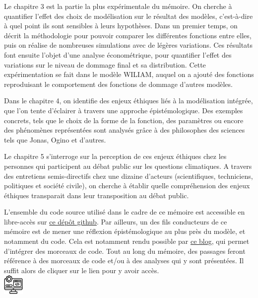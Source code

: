Le chapitre 3 est la partie la plus expérimentale du mémoire. On cherche à quantifier l'effet des choix de modélisation sur le résultat des modèles, c'est-à-dire à quel point ils sont sensibles à leurs hypothèses. Dans un premier temps, on décrit la méthodologie pour pouvoir comparer les différentes fonctions entre elles, puis on réalise de nombreuses simulations avec de légères variations. Ces résultats font ensuite l'objet d'une analyse économétrique, pour quantifier l'effet des variations sur le niveau de dommage final et sa distribution. Cette expérimentation se fait dans le modèle WILIAM, auquel on a ajouté des fonctions reproduisant le comportement des fonctions de dommage d'autres modèles.

Dans le chapitre 4, on identifie des enjeux éthiques liés à la modélisation intégrée, que l'on tente d'éclairer à travers une approche épistémologique. Des exemples concrets, tels que le choix de la forme de la fonction, des paramètres ou encore des phénomènes représentées sont analysés grâce à des philosophes des sciences tels que Jonas, Ogino et d'autres. 


Le chapitre 5 s'interroge sur la perception de ces enjeux éthiques chez les personnes qui participent au débat public sur les questions climatiques. A travers des entretiens semis-directifs chez une dizaine d'acteurs (scientifiques, techniciens, politiques et société civile), on cherche à établir quelle compréhension des enjeux éthiques transparait dans leur transposition au débat public. 

\begin{tcolorbox}[title=Avertissement]
    L'ensemble du code source utilisé dans le cadre de ce mémoire est accessible en libre-accès sur \href{https://github.com/ggenelot/damage-functions-modeling}{ce dépôt github}. Par ailleurs, un des fils conducteurs de ce mémoire est de mener une réflexion épistémologique au plus près du modèle, et notamment du code. Cela est notamment rendu possible par \href{https://damage-functions-modeling.readthedocs.io/en/latest/index.html}{ce blog}, qui permet d'intégrer des morceaux de code. Tout au long du mémoire, des passages feront référence à des morceaux de code et/ou à des analyses qui y sont présentées. Il suffit alors de cliquer sur le lien pour y avoir accès. \\


    \includegraphics[width=1cm]{figures/logos/development.png}


    
\end{tcolorbox}

